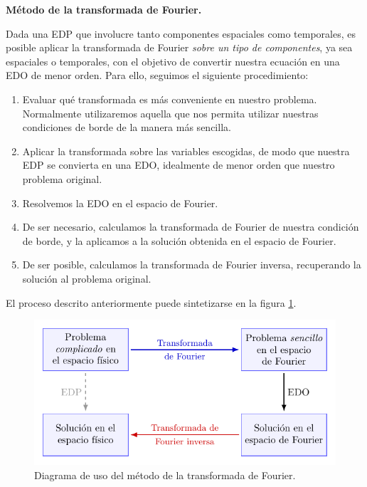 \begin{propo}
    \textbf{Método de la transformada de Fourier.} \par
    Dada una EDP que involucre tanto componentes espaciales como temporales, es posible aplicar la transformada de Fourier \emph{sobre un tipo de componentes}, ya sea espaciales o temporales, con el objetivo de convertir nuestra ecuación en una EDO de menor orden. Para ello, seguimos el siguiente procedimiento:
    \begin{enumerate}
        \item Evaluar qué transformada es más conveniente en nuestro problema. Normalmente utilizaremos aquella que nos permita utilizar nuestras condiciones de borde de la manera más sencilla.
        \item Aplicar la transformada sobre las variables escogidas, de modo que nuestra EDP se convierta en una EDO, idealmente de menor orden que nuestro problema original.
        \item Resolvemos la EDO en el espacio de Fourier.
        \item De ser necesario, calculamos la transformada de Fourier de nuestra condición de borde, y la aplicamos a la solución obtenida en el espacio de Fourier.
        \item De ser posible, calculamos la transformada de Fourier inversa, recuperando la solución al problema original.
    \end{enumerate}

\end{propo}

El proceso descrito anteriormente puede sintetizarse en la figura \ref{fig:Diagrama-Fourier}.
\begin{figure}[htbp]
    \centering
    \includegraphics[width = 12cm]{Figuras/Diagrama_Fourier.pdf}
    \caption{Diagrama de uso del método de la transformada de Fourier.}
    \label{fig:Diagrama-Fourier}
\end{figure}

